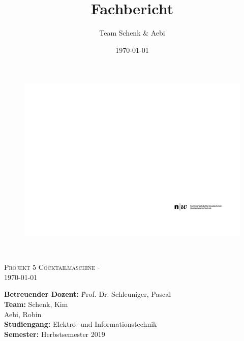 \documentclass[final]{fhnwreport}       	%
\title{Fachbericht}  		        		%
\author{Team Schenk \& Aebi}      				    %
\date{\today}          				   	%
\begin{document}
\thispagestyle{empty}
	\begin{figure}
		 \vspace*{-\topskip}\vspace*{-\headsep}
		\includegraphics[scale=1]{graphics/fhnw_ht_logo_de.pdf}
	\end{figure}
	\begin{center}
		\vspace*{2cm}
		{\huge{\textbf{\thetitle}}}\\
		\vspace*{0.5cm}
		
		{\scshape\Large Projekt 5 Cocktailmaschine - \theauthor \\} \Large{\today}
		\vfill
		\begin{normalsize}
			{\begin{tabbing}
					\textbf{Betreuender Dozent:} \hspace{5cm}\= Prof. Dr. Schleuniger, Pascal\\[0.8cm]		
					\textbf{Team:} \>Schenk, Kim \\ \>Aebi, Robin\\[0.8cm]
					\textbf{Studiengang:} \>Elektro- und Informationstechnik
					\\[0.8cm]	\textbf{Semester:} \>Herbstsemester 2019
			\end{tabbing}}
		\end{normalsize}
		\vfill
	\end{center}
\clearpage
			
\thispagestyle{empty}

\end{document}
